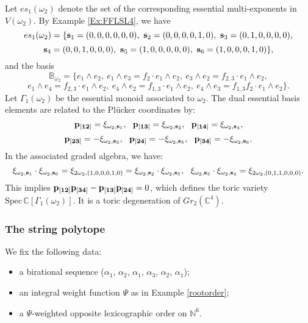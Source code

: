 \documentclass{emsprocart}
\theoremstyle{definition}
\begin{document}
Let $es_1(\omega_2)$ denote the set of the corresponding essential multi-exponents in $V(\omega_2)$. By Example \ref{Ex:FFLSL4}, we have
$$es_1(\omega_2)=\{\bold{s}_1=(0,0,0,0,0,0),\ \bold{s}_2=(0,0,0,0,1,0),\ \bold{s}_3=(0,1,0,0,0,0),$$ $$\bold{s}_4=(0,0,1,0,0,0),\ \bold{s}_5=(1,0,0,0,0,0),\ \bold{s}_6=(1,0,0,0,1,0)\},$$
and the basis
$$\mathbb{B}_{\omega_2}=\{e_1\wedge e_2,\ e_1\wedge e_3=f_2\cdot e_1\wedge e_2,\ e_3\wedge e_2=f_{2,3}\cdot e_1\wedge e_2,$$
$$e_1\wedge e_4=f_{2,3}\cdot e_1\wedge e_2,\ e_4\wedge e_2=f_{1,3}\cdot e_1\wedge e_2,\ e_4\wedge e_3=f_{1,3}f_2\cdot e_1\wedge e_2\}.$$
Let $\Gamma_1(\omega_2)$ be the essential monoid associated to $\omega_2$. The dual essential basis elements are related to the Pl\"ucker coordinates by:
$$\bold{p_{[12]}}=\xi_{\omega_2,\bold{s}_1},\ \ \bold{p_{[13]}}=\xi_{\omega_2,\bold{s}_2},\ \ \bold{p_{[14]}}=\xi_{\omega_2,\bold{s}_4},$$
$$\bold{p_{[23]}}=-\xi_{\omega_2,\bold{s}_3},\ \ \bold{p_{[24]}}=-\xi_{\omega_2,\bold{s}_5},\ \ \bold{p_{[34]}}=-\xi_{\omega_2,\bold{s}_6}.$$
In the associated graded algebra, we have:
$$\xi_{\omega_2,\bold{s}_1}\cdot \xi_{\omega_2,\bold{s}_6}=\xi_{2\omega_2,(1,0,0,0,1,0)}=\xi_{\omega_2,\bold{s}_2}\cdot \xi_{\omega_2,\bold{s}_5},\ \  \xi_{\omega_2,\bold{s}_3}\cdot \xi_{\omega_2,\bold{s}_4}=\xi_{2\omega_2,(0,1,1,0,0,0)}.$$
This implies $\bold{p_{[12]}}\bold{p_{[34]}}-\bold{p_{[13]}}\bold{p_{[24]}}=0$, which defines the toric variety $\textrm{Spec}\,\mathbb{C}[\Gamma_1(\omega_2)]$. It is a toric degeneration of $Gr_{2}(\mathbb C^4)$.


\subsubsection{The string polytope}\label{Sec:Stringpol}
We fix the following data:
\begin{itemize}
\item a birational sequence ($\alpha_1$, $\alpha_2$, $\alpha_1$, $\alpha_3$, $\alpha_2$, $\alpha_1$);
\item an integral weight function $\Psi$ as in Example \ref{rootorder};
\item a $\Psi$-weighted opposite lexicographic order on $\mathbb{N}^6$.
\end{itemize}
\end{document}
